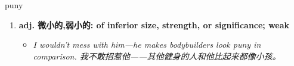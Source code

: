 
\begin{frame}
{\huge puny}
\begin{center}
\begin{enumerate}\Large
  \item \textbf{adj. 微小的,弱小的: of inferior size, strength, or significance; weak}
  \begin{itemize}
    \item \em{\Large{I wouldn't mess with him—he makes bodybuilders look puny in comparison. 我不敢招惹他——其他健身的人和他比起来都像小孩。}}
  \end{itemize}
\end{enumerate}
\end{center}
\end{frame}
